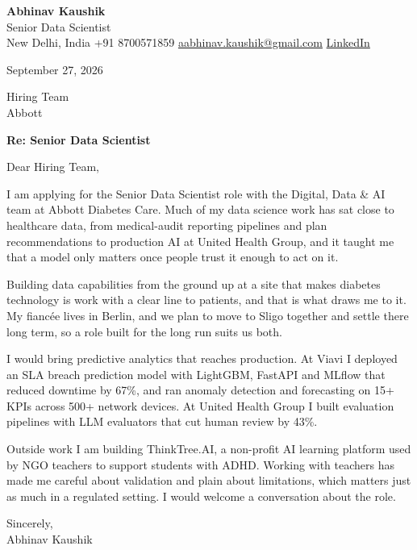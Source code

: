 \documentclass[11pt,a4paper]{article}
\begin{document}
{\Large\bfseries Abhinav Kaushik}\\
Senior Data Scientist\\
New Delhi, India \textbar{} +91 8700571859 \textbar{} \href{mailto:aabhinav.kaushik@gmail.com}{aabhinav.kaushik@gmail.com} \textbar{} \href{https://www.linkedin.com/in/abhinav-kaushik10/}{LinkedIn}  

September 27, 2026

Hiring Team\\
Abbott

\textbf{Re: Senior Data Scientist}

Dear Hiring Team,

I am applying for the Senior Data Scientist role with the Digital, Data \& AI team at Abbott Diabetes Care. Much of my data science work has sat close to healthcare data, from medical-audit reporting pipelines and plan recommendations to production AI at United Health Group, and it taught me that a model only matters once people trust it enough to act on it.

Building data capabilities from the ground up at a site that makes diabetes technology is work with a clear line to patients, and that is what draws me to it. My fiancée lives in Berlin, and we plan to move to Sligo together and settle there long term, so a role built for the long run suits us both.

I would bring predictive analytics that reaches production. At Viavi I deployed an SLA breach prediction model with LightGBM, FastAPI and MLflow that reduced downtime by 67\%, and ran anomaly detection and forecasting on 15+ KPIs across 500+ network devices. At United Health Group I built evaluation pipelines with LLM evaluators that cut human review by 43\%.

Outside work I am building ThinkTree.AI, a non-profit AI learning platform used by NGO teachers to support students with ADHD. Working with teachers has made me careful about validation and plain about limitations, which matters just as much in a regulated setting. I would welcome a conversation about the role.

Sincerely,\\[4pt]
Abhinav Kaushik
\end{document}
